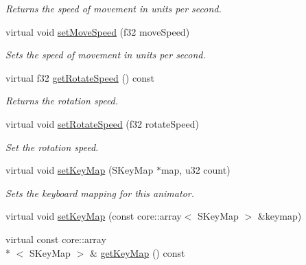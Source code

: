 \begin{DoxyCompactItemize}
\begin{DoxyCompactList}\small\item\em Returns the speed of movement in units per second. \end{DoxyCompactList}\item 
virtual void \hyperlink{classirr_1_1scene_1_1_c_scene_node_animator_camera_f_p_s_a644f6b5d1823a887c375320df91dd292}{set\-Move\-Speed} (f32 move\-Speed)
\begin{DoxyCompactList}\small\item\em Sets the speed of movement in units per second. \end{DoxyCompactList}\item 
virtual f32 \hyperlink{classirr_1_1scene_1_1_c_scene_node_animator_camera_f_p_s_ad771362c0af30759c572f1e8f1a807f3}{get\-Rotate\-Speed} () const 
\begin{DoxyCompactList}\small\item\em Returns the rotation speed. \end{DoxyCompactList}\item 
virtual void \hyperlink{classirr_1_1scene_1_1_c_scene_node_animator_camera_f_p_s_a4a07a826e69b2b247d6778f640011948}{set\-Rotate\-Speed} (f32 rotate\-Speed)
\begin{DoxyCompactList}\small\item\em Set the rotation speed. \end{DoxyCompactList}\item 
virtual void \hyperlink{classirr_1_1scene_1_1_c_scene_node_animator_camera_f_p_s_a2366a78aa414bb9c585614c8b25c7437}{set\-Key\-Map} (S\-Key\-Map $\ast$map, u32 count)
\begin{DoxyCompactList}\small\item\em Sets the keyboard mapping for this animator. \end{DoxyCompactList}\item 
virtual void \hyperlink{classirr_1_1scene_1_1_c_scene_node_animator_camera_f_p_s_ac10585a69457ca50fc8eeb9d22e09c35}{set\-Key\-Map} (const core\-::array$<$ S\-Key\-Map $>$ \&keymap)
\item 
\hypertarget{classirr_1_1scene_1_1_c_scene_node_animator_camera_f_p_s_a16bf719bb80c1b1fcad08f6d05818437}{virtual const core\-::array\\*
$<$ S\-Key\-Map $>$ \& \hyperlink{classirr_1_1scene_1_1_c_scene_node_animator_camera_f_p_s_a16bf719bb80c1b1fcad08f6d05818437}{get\-Key\-Map} () const }\label{classirr_1_1scene_1_1_c_scene_node_animator_camera_f_p_s_a16bf719bb80c1b1fcad08f6d05818437}


\end{DoxyCompactItemize}
